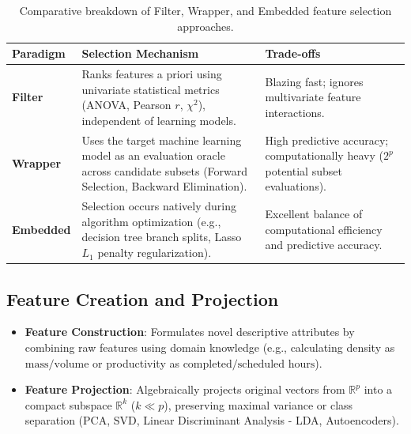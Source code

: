 \begin{table}[htbp]
    \centering
    \small
    \begin{tabularx}{\textwidth}{lXX}
        \toprule
        \textbf{Paradigm} & \textbf{Selection Mechanism} & \textbf{Trade-offs} \\
        \midrule
        \textbf{Filter} & Ranks features a priori using univariate statistical metrics (ANOVA, Pearson $r$, $\chi^2$), independent of learning models. & Blazing fast; ignores multivariate feature interactions. \\
        \addlinespace
        \textbf{Wrapper} & Uses the target machine learning model as an evaluation oracle across candidate subsets (Forward Selection, Backward Elimination). & High predictive accuracy; computationally heavy ($2^p$ potential subset evaluations). \\
        \addlinespace
        \textbf{Embedded} & Selection occurs natively during algorithm optimization (e.g., decision tree branch splits, Lasso $L_1$ penalty regularization). & Excellent balance of computational efficiency and predictive accuracy. \\
        \bottomrule
    \end{tabularx}
    \caption{Comparative breakdown of Filter, Wrapper, and Embedded feature selection approaches.}
    \label{tab:dm-feature-selection-methods}
\end{table}

\subsection{Feature Creation and Projection}
\begin{itemize}
    \item \textbf{Feature Construction}: Formulates novel descriptive attributes by combining raw features using domain knowledge (e.g., calculating density as $\text{mass}/\text{volume}$ or productivity as $\text{completed}/\text{scheduled hours}$).
    \item \textbf{Feature Projection}: Algebraically projects original vectors from $\mathbb{R}^p$ into a compact subspace $\mathbb{R}^k$ ($k \ll p$), preserving maximal variance or class separation (PCA, SVD, Linear Discriminant Analysis - LDA, Autoencoders).
\end{itemize}


